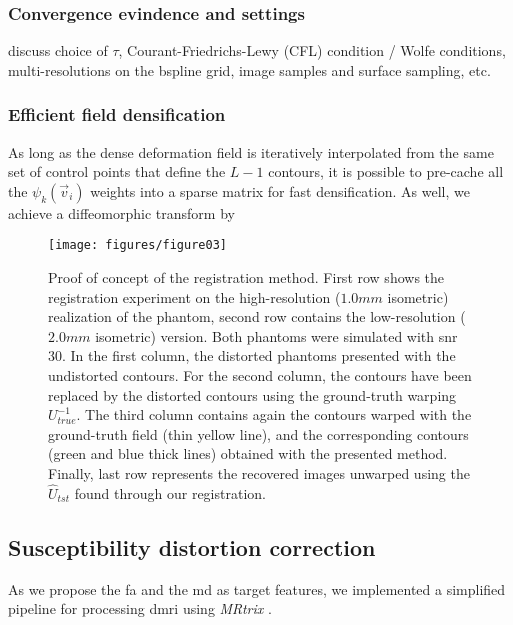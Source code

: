 {\color{red}
\subsubsection{Convergence evindence and settings}
 discuss choice of $\tau$, Courant-Friedrichs-Lewy (CFL) condition / Wolfe conditions, multi-resolutions on the bspline grid, image samples and surface sampling,  etc.
\subsubsection{Efficient field densification}
As long as the dense deformation field is iteratively interpolated
from the same set of control points that define the $L-1$ contours,
it is possible to pre-cache all the $\psi_k(\vec{v}_i)$ weights into a
sparse matrix for fast densification. As well, we achieve a
diffeomorphic transform by}





\begin{figure*}
\texttt{[image: figures/figure03]}
\caption{Proof of concept of the registration method. First row shows the registration experiment
  on the high-resolution ($1.0mm$ isometric) realization of the phantom, second row contains the
  low-resolution ($2.0mm$ isometric) version.
  Both phantoms were simulated with \gls*{snr} 30.
  In the first column, the distorted phantoms presented with the undistorted contours.
  For the second column, the contours have been replaced by the distorted contours using
    the ground-truth warping $U^{-1}_{true}$.
  The third column contains again the contours warped with the ground-truth field
  (thin yellow line), and the corresponding contours (green and blue thick lines)
  obtained with the presented method.
  Finally, last row represents the recovered images unwarped using the $\hat{U}_{tst}$
    found through our registration.
  }\label{fig:results_phantom}
\end{figure*}

\subsection{Susceptibility distortion correction}
\label{sec:results_hcp}

As we propose the \gls*{fa} and the \gls*{md} as target features, we
  implemented a simplified pipeline for processing \gls*{dmri} using
  \emph{MRtrix} \citep{tournier_mrtrix_2012}.


